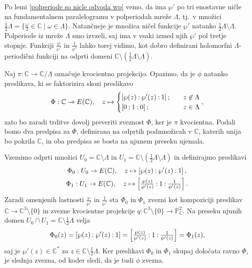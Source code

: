 \documentclass[mat1]{fmfdelo}
\numberwithin{equation}{section}
\newcommand{\C}{\mathbb C}
\newcommand{\CM}{\mathbb C ^*}
\newcommand{\PC}{\mathbb{P}^2_\C}
\newcommand{\oio}{\pcoor{0: 1 : 0}}
\newcommand{\om}{\omega}
\newcommand{\torus}{\C/\Lambda}
\newcommand{\pcoor}[1]{%
\begingroup\lccode`~=`: \lowercase{\endgroup
\edef~}{\mathbin{\mathchar\the\mathcode`:}\nobreak}%
\left[%
\begingroup
\mathcode`:=\string"8000
#1%
\endgroup
\right]%
}
\newcommand{\tj}{tj.\ }
\theoremstyle{definition}
\begin{document}
\begin{dokaz}
    Po lemi \ref{polperiode so nicle odvoda wp} vemo, da ima $\wp'$ po tri enostavne ničle na fundamentalnem paralelogramu v polperiodah mreže $\Lambda$, \tj v množici $\frac{1}{2}\Lambda = \{\frac{\om}{2} \in \C \mid \om \in \Lambda\}$. 
    Natančneje je množica ničel funkcije $\wp'$ natanko $\frac12\Lambda \setminus \Lambda$. Polperiode iz mreže $\Lambda$ smo izvzeli, saj ima v vsaki izmed njih $\wp'$ pol tretje stopnje. 
    Funkciji $\frac{\wp}{\wp'}$ in $\frac{1}{\wp'}$ lahko torej vidimo, kot dobro definirani holomorfni $\Lambda$-periodični funkciji na odprti domeni $\C \setminus (\frac12\Lambda \setminus \Lambda)$. 

    
    Naj $\pi : \C \to \torus$ označuje kvocientno projekcijo. Opazimo, da je $\phi$ natanko preslikava, ki se faktorizira skozi preslikavo
    \[
        \Phi: \C \to E(\C), \quad z \mapsto
        \begin{cases}
            \pcoor{\wp(z) : \wp'(z) : 1}; \quad &z \not\in \Lambda \\
            \oio; \quad &z \in \Lambda
        \end{cases}, 
    \]
    zato bo zaradi trditve \cite[trditev 3.22]{MrcunTop} dovolj preveriti zveznost $\Phi$, ker je $\pi$ kvocientna. Podali bomo dva predpisa za $\Phi$, definirana na odprtih podmnožicah v $\C$, katerih unija bo pokrila $\C$, in oba predpisa se bosta na njunem preseku ujemala. 
    
    Vzemimo odprti množici $U_0 = \C \setminus \Lambda$ in $U_1 = \C \setminus (\frac12\Lambda \setminus \Lambda)$ in definirajmo preslikavi
    \begin{gather*}
        \Phi_0 : U_0 \to E(\C), \quad z \mapsto \pcoor{\wp(z) : \wp'(z) : 1}, \\
        \Phi_1 : U_1 \to E(\C), \quad z \mapsto \pcoor{\tfrac{\wp(z)}{\wp'(z)} : 1 : \tfrac{1}{\wp'(z)}}.
    \end{gather*}
    Zaradi omenjenih lastnosti $\tfrac{\wp}{\wp'}$ in $\tfrac{1}{\wp'}$ sta $\Phi_0$ in $\Phi_1$ zvezni kot kompoziciji preslikav $\C \to \C^3\setminus\{0\}$ in zvezne kvocientne projekcije $q:\C^3\setminus\{0\} \to \PC$. Na preseku njunih domen $U_0 \cap U_1 = \C \setminus \frac12\Lambda$ velja
    \[
        \Phi_0(z) = \pcoor{\wp(z) : \wp'(z) : 1} = 
        \pcoor{\tfrac{\wp(z)}{\wp'(z)} : 1 : \tfrac{1}{\wp'(z)}} = \Phi_1(z),
    \]
    saj je $\wp'(z) \in \CM$ za $z \in \C \setminus \frac12\Lambda$. Ker preslikavi $\Phi_0$ in $\Phi_1$ skupaj določata ravno $\Phi$, je slednja zvezna, od koder sledi, da je tudi $\phi$ zvezna.  
     

\end{dokaz}
\end{document}
